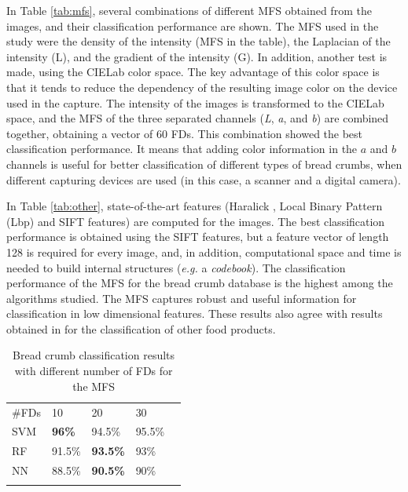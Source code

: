 In Table \ref{tab:mfs}, several combinations of different MFS obtained from the images, and their classification performance are shown. The MFS used in the study were the density of the intensity (MFS in the table), the Laplacian of the intensity (L), and the gradient of the intensity (G). In addition, another test is made, using the CIELab color space. The key advantage of this color space is that it tends to reduce the dependency of the resulting image color on the device used in the capture. The intensity of the images is transformed to the CIELab space, and the MFS of the three separated channels ({\em L}, {\em a}, and {\em b}) are combined together, obtaining a vector of $60$ FDs. This combination showed the best classification performance. It means that adding color information in the $a$ and $b$ channels is useful for better classification of different types of bread crumbs, when different capturing devices are used (in this case, a scanner and a digital camera).

In Table \ref{tab:other}, state-of-the-art features (Haralick \cite{Haralick73}, Local Binary Pattern (Lbp) \cite{Ojala96} and SIFT \cite{Lowe2004} features) are computed for the images. The best classification performance is obtained using the SIFT features, but a feature vector of length 128 is required for every image, and, in addition, computational space and time is needed to build internal structures ({\em e.g.} a {\em codebook}). The classification performance of the MFS for the bread crumb database is the highest among the algorithms studied. The MFS captures robust and useful information for classification in low dimensional features. These results also agree with results obtained in \cite{Bosch2011} for the classification of other food products.

\begin{table}
\caption{Bread crumb classification results with different number of FDs for the MFS}
\label{tab:number}       %
\begin{tabular}{lllll}
\hline\noalign{\smallskip}
\#FDs & 10  & 20 & 30 \\
\noalign{\smallskip}\hline\noalign{\smallskip}
SVM & \textbf{96\%} & 94.5\% & 95.5\% \\
RF  & 91.5\% & \textbf{93.5\%} & 93\% \\
NN & 88.5\% & \textbf{90.5\%} & 90\% \\
\noalign{\smallskip}\hline
\end{tabular}
\end{table}


